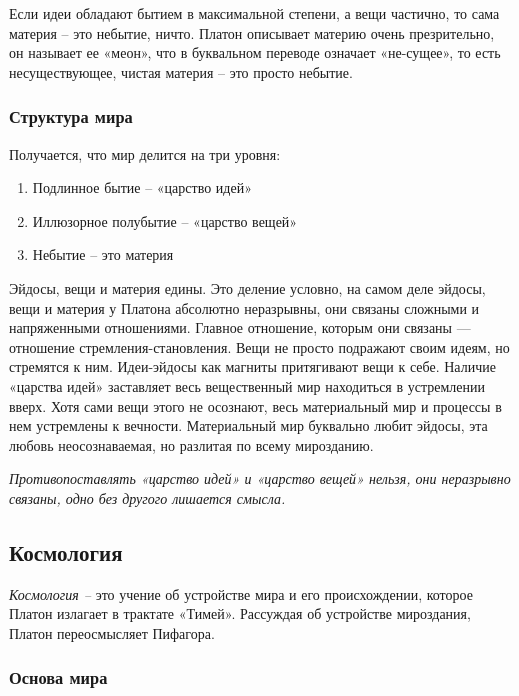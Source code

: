 \documentclass[a4paper, 14pt]{extreport}
\begin{document}
Если идеи обладают бытием в максимальной степени, а вещи частично, то
сама материя -- это небытие, ничто. Платон описывает материю очень
презрительно, он называет ее «меон», что в буквальном переводе означает
«не-сущее», то есть несуществующее, чистая материя -- это просто
небытие.

\subsubsection{Структура мира}

Получается, что мир делится на три уровня:

\begin{enumerate}
\def\labelenumi{\arabic{enumi}.}

\item
  Подлинное бытие -- «царство идей»
\item
  Иллюзорное полубытие -- «царство вещей»
\item
  Небытие -- это материя
\end{enumerate}

Эйдосы, вещи и материя едины. Это деление условно, на самом деле эйдосы,
вещи и материя у Платона абсолютно неразрывны, они связаны сложными и
напряженными отношениями. Главное отношение, которым они связаны ---
отношение стремления-становления. Вещи не просто подражают своим идеям,
но стремятся к ним. Идеи-эйдосы как магниты притягивают вещи к себе.
Наличие «царства идей» заставляет весь вещественный мир находиться в
устремлении вверх. Хотя сами вещи этого не осознают, весь материальный
мир и процессы в нем устремлены к вечности. Материальный мир буквально
любит эйдосы, эта любовь неосознаваемая, но разлитая по всему
мирозданию.

\emph{Противопоставлять «царство идей» и «царство вещей» нельзя, они
неразрывно связаны, одно без другого лишается смысла.}

\subsection{Космология}

\emph{Космология --}
это учение об устройстве мира и его происхождении, которое Платон
излагает в трактате «Тимей». Рассуждая об устройстве мироздания, Платон
переосмысляет Пифагора.


\subsubsection{Основа мира}
\end{document}
